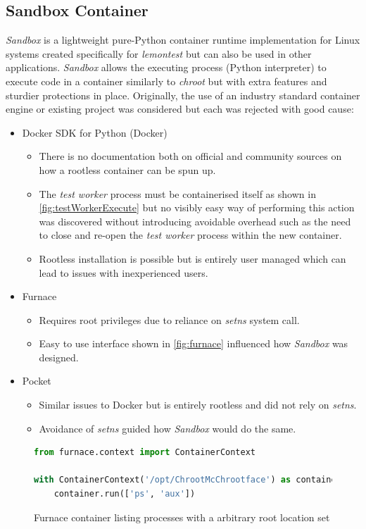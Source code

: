 \documentclass[hidelinks]{report}
\begin{document}
\subsection{Sandbox Container}\label{sandboxContainer}
\textit{Sandbox} is a lightweight pure-Python container runtime implementation for Linux systems created specifically for \textit{lemontest} but can also be used in other applications. \textit{Sandbox} allows the executing process (Python interpreter) to execute code in a container similarly to \textit{chroot} but with extra features and sturdier protections in place.
Originally, the use of an industry standard container engine or existing project was considered but each was rejected with good cause:
\begin{itemize}
	\item Docker SDK for Python (Docker) \cite{docker-py}
	\begin{itemize}
		\item There is no documentation both on official and community sources on how a rootless container can be spun up.
		\item The \textit{test worker} process must be containerised itself as shown in \autoref{fig:testWorkerExecute} but no visibly easy way of performing this action was discovered without introducing avoidable overhead such as the need to close and re-open the \textit{test worker} process within the new container.
		\item Rootless installation is possible but is entirely user managed which can lead to issues with inexperienced users.
	\end{itemize}
	\item Furnace \cite{furnace}
	\begin{itemize}
		\item Requires root privileges due to reliance on \textit{setns} system call.
		\item Easy to use interface shown in \autoref{fig:furnace} influenced how \textit{Sandbox} was designed.
	\end{itemize}
	\item Pocket \cite{pocket}
	\begin{itemize}
		\item Similar issues to Docker but is entirely rootless and did not rely on \textit{setns}.
		\item Avoidance of \textit{setns} guided how \textit{Sandbox} would do the same.
	\end{itemize}
\end{itemize}
\begin{figure}[h]
	\centering
	\begin{lstlisting}[language=python, breaklines=true, linewidth=\linewidth, tabsize=4]
from furnace.context import ContainerContext

with ContainerContext('/opt/ChrootMcChrootface') as container:
    container.run(['ps', 'aux'])
	\end{lstlisting}
	\caption{Furnace container listing processes with a arbitrary root location set}
	\label{fig:furnace}
\end{figure}
\end{document}
